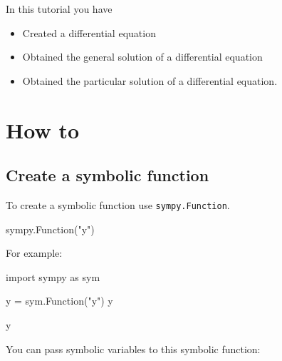\begin{note}
In this tutorial you have
\begin{itemize}
\item 

Created a differential equation

\item 

Obtained the general solution of a differential equation

\item 

Obtained the particular solution of a differential equation.

\end{itemize}
\end{note}





\section{How to}
\label{\detokenize{tools-for-mathematics/09-differential-equations/how/main:how}}\label{\detokenize{tools-for-mathematics/09-differential-equations/how/main::doc}}

\subsection{Create a symbolic function}
\label{\detokenize{tools-for-mathematics/09-differential-equations/how/main:how-to-create-a-symbolic-function}}

To create a symbolic function use \texttt{sympy.Function}.


\begin{pyin}
sympy.Function("y")
\end{pyin}



For example:




\begin{pyin}
import sympy as sym

y = sym.Function("y")
y
\end{pyin}





\begin{raw}
y
\end{raw}





You can pass symbolic variables to this symbolic function:





